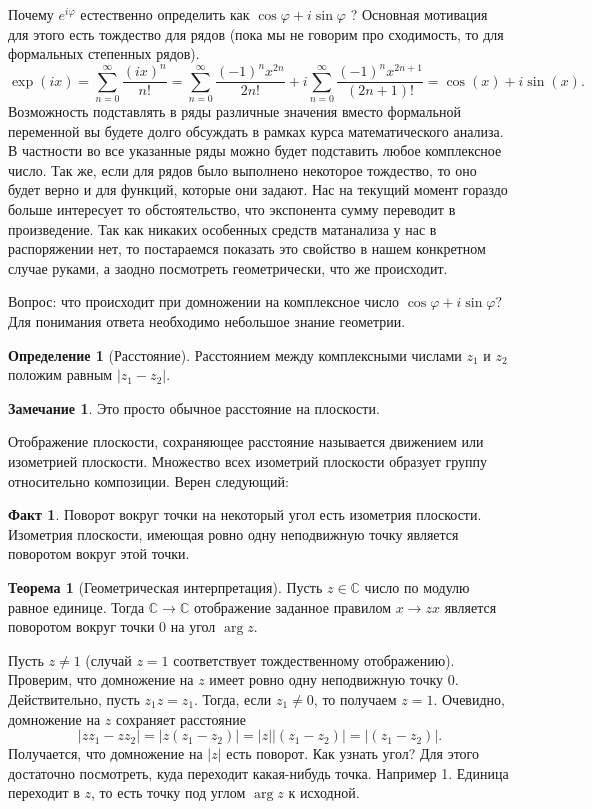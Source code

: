\documentclass[10pt,a4paper,oneside]{book} %
\theoremstyle{definition}
\newtheorem*{rem}{Замечание}
\newtheorem*{defn}{Определение}
\newtheorem*{fact}{Факт}
\newtheorem{thm}{Теорема}
\newcommand{\mb}[1]{\mathbb{#1}}
\def\thrm{\begin{thm}}
\def\ethrm{\end{thm}}
\def\dfn{\begin{defn}}
\def\edfn{\end{defn}}
\def\rm{\begin{rem}}
\def\erm{\end{rem}}
\begin{document}
Почему $e^{i\varphi}$ естественно определить как $\cos\varphi+i\sin \varphi$ ? Основная мотивация для этого есть тождество для рядов  (пока мы не говорим про сходимость, то для формальных степенных рядов).
$$\exp(ix) = \sum_{n=0}^{\infty} \frac{(ix)^n}{n!}=\sum_{n=0}^{\infty} \frac{(-1)^n x^{2n}}{2n!} + i\sum_{n=0}^{\infty} \frac{(-1)^n x^{2n+1}}{(2n+1)!}= \cos(x) + i\sin(x).$$
Возможность подставлять в ряды различные значения вместо формальной переменной вы будете долго обсуждать в рамках курса математического анализа. В частности во все указанные ряды можно будет подставить любое комплексное число. Так же, если для рядов было выполнено некоторое тождество, то оно будет верно и для функций, которые они задают.
Нас на текущий момент гораздо больше  интересует то обстоятельство, что экспонента сумму переводит в произведение. Так как никаких особенных средств матанализа у нас в распоряжении нет, то постараемся показать это свойство в нашем конкретном случае руками, а заодно посмотреть геометрически, что же происходит.


Вопрос: что происходит при домножении на комплексное число $\cos \varphi + i \sin \varphi$? Для понимания ответа необходимо небольшое знание геометрии.
\dfn[Расстояние] Расстоянием между комплексными числами $z_1$ и $z_2$ положим равным $|z_1-z_2 |$.
\edfn

\rm Это просто обычное расстояние на плоскости.
\erm

Отображение плоскости, сохраняющее расстояние называется движением или изометрией плоскости. Множество всех изометрий плоскости образует группу относительно композиции. Верен следующий:
\begin{fact} Поворот вокруг точки на некоторый угол есть изометрия плоскости. Изометрия плоскости, имеющая ровно
одну неподвижную точку является поворотом вокруг этой точки.
\end{fact}

\thrm[Геометрическая интерпретация] Пусть $z\in \mb C$ число по модулю равное единице. Тогда $\mb C \to \mb C$ отображение заданное правилом $ x\to zx$   является поворотом вокруг точки 0 на угол $\arg z$.
\ethrm
\proof Пусть $z\neq 1$ (случай $z=1$ соответствует тождественному отображению). Проверим, что домножение на $z$ имеет ровно одну неподвижную точку 0. Действительно, пусть $z_1z=z_1$. Тогда, если $z_1\neq 0$, то получаем $z=1$. Очевидно, домножение на $z$ сохраняет расстояние $$|zz_1-zz_2|=|z(z_1-z_2)|=|z||(z_1-z_2)|=|(z_1-z_2)|.$$
Получается, что домножение на $|z|$ есть поворот. Как узнать угол? Для этого достаточно посмотреть, куда переходит какая-нибудь точка. Например 1. Единица переходит в $z$, то есть точку под углом $\arg z$ к исходной.
\endproof
\end{document}
